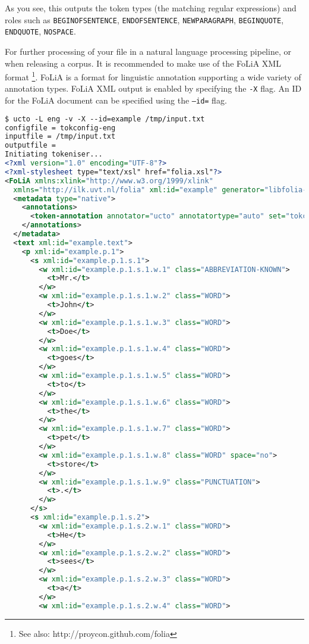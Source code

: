 \documentclass[a4paper,12pt]{report}
\begin{document}
As you see, this outputs the token types (the matching regular expressions) and roles such as \texttt{BEGINOFSENTENCE}, \texttt{ENDOFSENTENCE}, \texttt{NEWPARAGRAPH}, \texttt{BEGINQUOTE}, \texttt{ENDQUOTE}, \texttt{NOSPACE}.

For further processing of your file in a natural language processing pipeline, or when releasing a corpus. It is recommended to make use of the FoLiA XML format \cite{FOLIA} \footnote{See also:  http://proycon.github.com/folia}. FoLiA is a format for linguistic annotation supporting a wide variety of annotation types. FoLiA XML output is enabled by specifying the \texttt{-X} flag. An ID for the FoLiA document can be specified using the \texttt{--id=} flag.

\begin{lstlisting}[language=xml]
$ ucto -L eng -v -X --id=example /tmp/input.txt
configfile = tokconfig-eng
inputfile = /tmp/input.txt
outputfile =
Initiating tokeniser...
<?xml version="1.0" encoding="UTF-8"?>
<?xml-stylesheet type="text/xsl" href="folia.xsl"?>
<FoLiA xmlns:xlink="http://www.w3.org/1999/xlink"
  xmlns="http://ilk.uvt.nl/folia" xml:id="example" generator="libfolia-v0.10">
  <metadata type="native">
    <annotations>
      <token-annotation annotator="ucto" annotatortype="auto" set="tokconfig-en"/>
    </annotations>
  </metadata>
  <text xml:id="example.text">
    <p xml:id="example.p.1">
      <s xml:id="example.p.1.s.1">
        <w xml:id="example.p.1.s.1.w.1" class="ABBREVIATION-KNOWN">
          <t>Mr.</t>
        </w>
        <w xml:id="example.p.1.s.1.w.2" class="WORD">
          <t>John</t>
        </w>
        <w xml:id="example.p.1.s.1.w.3" class="WORD">
          <t>Doe</t>
        </w>
        <w xml:id="example.p.1.s.1.w.4" class="WORD">
          <t>goes</t>
        </w>
        <w xml:id="example.p.1.s.1.w.5" class="WORD">
          <t>to</t>
        </w>
        <w xml:id="example.p.1.s.1.w.6" class="WORD">
          <t>the</t>
        </w>
        <w xml:id="example.p.1.s.1.w.7" class="WORD">
          <t>pet</t>
        </w>
        <w xml:id="example.p.1.s.1.w.8" class="WORD" space="no">
          <t>store</t>
        </w>
        <w xml:id="example.p.1.s.1.w.9" class="PUNCTUATION">
          <t>.</t>
        </w>
      </s>
      <s xml:id="example.p.1.s.2">
        <w xml:id="example.p.1.s.2.w.1" class="WORD">
          <t>He</t>
        </w>
        <w xml:id="example.p.1.s.2.w.2" class="WORD">
          <t>sees</t>
        </w>
        <w xml:id="example.p.1.s.2.w.3" class="WORD">
          <t>a</t>
        </w>
        <w xml:id="example.p.1.s.2.w.4" class="WORD">

\end{lstlisting}
\end{document}
